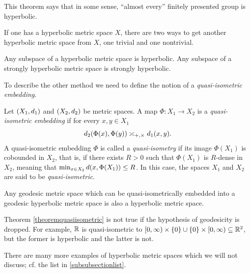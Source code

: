 This theorem says that in some sense, ``almost every'' finitely presented group is hyperbolic.


If one has a hyperbolic metric space $X$, there are two ways to get another hyperbolic metric space from $X$, one trivial and one nontrivial.

\begin{observation}
\label{observationsubspace}
Any subspace of a hyperbolic metric space is hyperbolic. Any subspace of a strongly hyperbolic metric space is strongly hyperbolic.
\end{observation}

To describe the other method we need to define the notion of a \emph{quasi-isometric embedding}.
\begin{definition}
\label{definitionquasiisometry}
Let $(X_1,d_1)$ and $(X_2,d_2)$ be metric spaces. A map $\Phi:X_1\to X_2$ is a \emph{quasi-isometric embedding} if for every $x,y\in X_1$
\[
d_2(\Phi(x),\Phi(y)) \asymp_{+,\times} d_1(x,y).
\]
A quasi-isometric embedding $\Phi$ is called a \emph{quasi-isometry} if its image $\Phi(X_1)$ is cobounded in $X_2$, that is, if there exists $R > 0$ such that $\Phi(X_1)$ is $R$-dense in $X_2$, meaning that $\min_{x\in X_2} d(x,\Phi(X_1)) \leq R$. In this case, the spaces $X_1$ and $X_2$ are said to be \emph{quasi-isometric}.
\end{definition}

\begin{theorem}
\label{theoremquasiisometric}
Any geodesic metric space which can be quasi-isometrically embedded into a geodesic hyperbolic metric space is also a hyperbolic metric space.
\end{theorem}

\begin{remark}
Theorem \ref{theoremquasiisometric} is not true if the hypothesis of geodesicity is dropped. For example, $\R$ is quasi-isometric to $\Rplus\times\{0\}\cup\{0\}\times\Rplus\subset\R^2$, but the former is hyperbolic and the latter is not.
\end{remark}

There are many more examples of hyperbolic metric spaces which we will not discuss; cf. the list in \6\ref{subsubsectionlist}.


